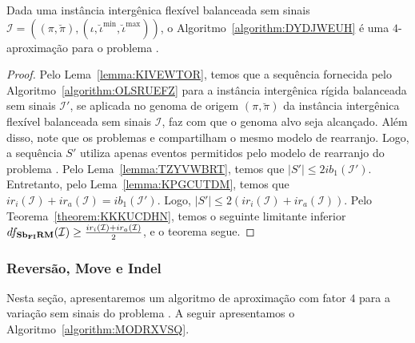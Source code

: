 \begin{theorem}\label{theorem:MALFMHVQ}
Dada uma instância intergênica flexível balanceada sem sinais $\mathcal{I} = ((\pi,\breve\pi),(\iota,\breve\iota^{\min},\breve\iota^{\max}))$, o Algoritmo~\ref{algorithm:DYDJWEUH} é uma $4$-aproximação para o problema \SbFIRM{}.
\end{theorem}
\begin{proof}
Pelo Lema~\ref{lemma:KIVEWTOR}, temos que a sequência fornecida pelo Algoritmo~\ref{algorithm:OLSRUEFZ} para a instância intergênica rígida balanceada sem sinais $\mathcal{I'}$, se aplicada no genoma de origem $(\pi,\breve\pi)$ da instância intergênica flexível balanceada sem sinais $\mathcal{I}$, faz com que o genoma alvo seja alcançado. Além disso, note que os problemas \SbIRM{} e \SbFIRM{} compartilham o mesmo modelo de rearranjo. Logo, a sequência $S'$ utiliza apenas eventos permitidos pelo modelo de rearranjo do problema \SbFIRM{}. Pelo Lema~\ref{lemma:TZYVWBRT}, temos que $|S'| \le 2ib_1(\mathcal{I'})$. Entretanto, pelo Lema~\ref{lemma:KPGCUTDM}, temos que $ir_i(\mathcal{I}) + ir_a(\mathcal{I}) = ib_1(\mathcal{I'})$. Logo, $|S'| \le 2(ir_i(\mathcal{I}) + ir_a(\mathcal{I}))$. Pelo Teorema~\ref{theorem:KKKUCDHN}, temos o seguinte limitante inferior $df_{\textbf{Sb\textsubscript{FI}RM}}(\mathcal{I}) \ge \frac{ir_i(\mathcal{I}) + ir_a(\mathcal{I})}{2}$, e o teorema segue.
\end{proof}

\subsubsection{Reversão, Move e Indel}

Nesta seção, apresentaremos um algoritmo de aproximação com fator $4$ para a variação sem sinais do problema \SbFIRMI{}. A seguir apresentamos o Algoritmo~\ref{algorithm:MODRXVSQ}.



